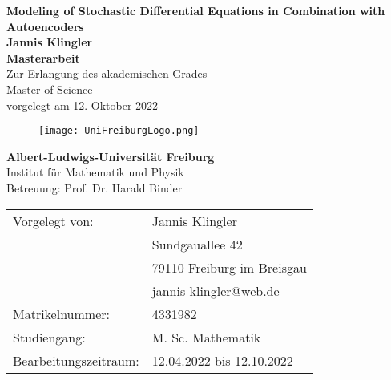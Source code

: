 \documentclass[11pt,titlepage]{article}
\theoremstyle{definition}
\theoremstyle{remark}
\begin{document}
	\setlength{\parindent}{0em}
	\onehalfspacing
	\begin{titlepage}
		\begin{center}
			\huge\textbf{Modeling of Stochastic Differential Equations in Combination 
			with Autoencoders}\\
			\vspace{1.2cm}
			\LARGE\textbf{{Jannis Klingler}}\\
			\vspace{0.5cm}
			\LARGE\textbf{{Masterarbeit}}\\
			\vspace{0.5cm}
			\normalsize
			Zur Erlangung des akademischen Grades\\
			Master of Science\\
			\vspace{0.3cm}
			vorgelegt am 12. Oktober 2022 \\
			\vspace{0.7cm}
			
			\begin{figure}[h!]
				\centering
				\texttt{[image: UniFreiburgLogo.png]}
			\end{figure}
			
			\vspace{0.7cm}
			\large \textbf{Albert-Ludwigs-Universität Freiburg}\\
			\vspace{0.2cm}
			\large {Institut für Mathematik und Physik}\\
			\large {Betreuung: Prof. Dr. Harald Binder}\\
			\vspace{1.8cm}
		\end{center}
	\end{titlepage}
	
	\thispagestyle{empty}
	\vspace*{17cm}
	\begin{tabular}{ll}
		Vorgelegt von: & Jannis Klingler \\
		& Sundgauallee 42\\
		& 79110 Freiburg im Breisgau
		\\
		& jannis-klingler@web.de\\
		Matrikelnummer: & {4331982} \\
		Studiengang: & {M. Sc. Mathematik}\\
		Bearbeitungszeitraum: & {12.04.2022 bis 12.10.2022} \\
	\end{tabular}\\
	
\end{document}
